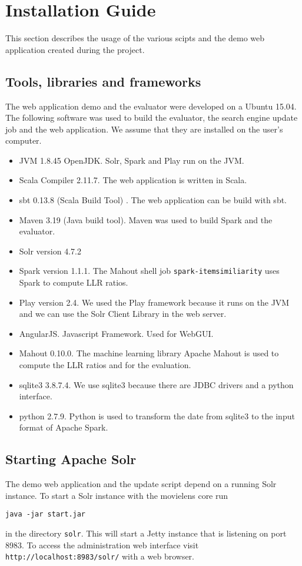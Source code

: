 \section{Installation Guide}
This section describes the usage of the various scipts and the demo web application created during the project.
\subsection{Tools, libraries and frameworks}
The web application demo and the evaluator were developed on a Ubuntu 15.04. 
The following software was used to build the evaluator, the search engine update job and the web application. We assume that they are installed on the user's computer.
\begin{itemize}
\item JVM 1.8.45 OpenJDK. Solr, Spark and Play run on the JVM.
\item Scala Compiler 2.11.7. The web application is written in Scala.
\item sbt 0.13.8 (Scala Build Tool) . The web application can be build with sbt.
\item Maven 3.19 (Java build tool). Maven was used to build Spark and the evaluator.
\item Solr version 4.7.2
\item Spark version 1.1.1. The Mahout shell job \verb|spark-itemsimiliarity| uses Spark to compute LLR ratios.
\item Play version 2.4. We used the Play framework because it runs on the JVM and we can use the Solr Client Library in the web server.
\item AngularJS. Javascript Framework. Used for WebGUI.
\item Mahout 0.10.0. The machine learning library Apache Mahout is used to compute the LLR ratios and for the evaluation.
\item sqlite3 3.8.7.4. We use sqlite3 because there are JDBC drivers and a python interface.
\item python 2.7.9. Python is used to transform the date from sqlite3 to the input format of Apache Spark.
\end{itemize}

\subsection{Starting Apache Solr}
\label{sec:startsolr}
The demo web application and the update script depend on a running Solr instance.
To start a Solr instance with the movielens core run
\begin{verbatim}
java -jar start.jar
\end{verbatim}
in the directory \verb|solr|.
This will start a Jetty instance that is listening on port 8983. To access the administration web interface visit \verb|http://localhost:8983/solr/| with a web browser.

